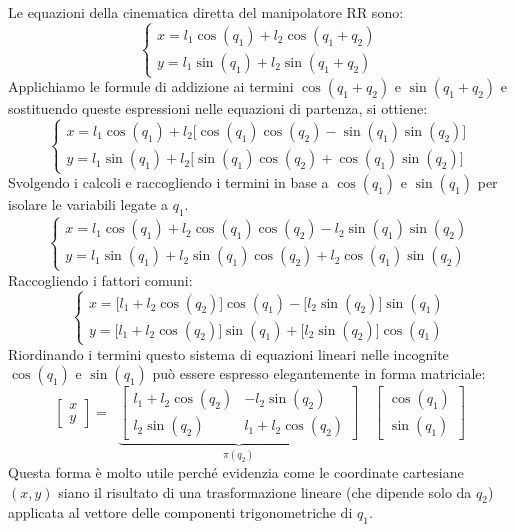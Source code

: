 \documentclass[11pt, a4paper]{report}
\begin{document}
Le equazioni della cinematica diretta del manipolatore RR sono:
\[
    \begin{cases}
        x = l_1 \cos(q_1) + l_2 \cos(q_1 + q_2) \\
        y = l_1 \sin(q_1) + l_2 \sin(q_1 + q_2)
    \end{cases}
\]
Applichiamo le formule di addizione ai termini $\cos(q_1 + q_2)$ e $\sin(q_1 + q_2)$ e sostituendo queste espressioni nelle equazioni di partenza, si ottiene:
\[
    \begin{cases}
        x = l_1 \cos(q_1) + l_2\biggl[\cos(q_{1})\cos(q_{2}) - \sin(q_{1})\sin(q_{2}) \biggr] \\
        y = l_1 \sin(q_1) + l_2\biggl[ \sin(q_{1})\cos(q_{2}) + \cos(q_{1})\sin(q_{2}) \biggr]
    \end{cases}
\]
Svolgendo i calcoli e raccogliendo i termini in base a $\cos(q_1)$ e $\sin(q_1)$ per isolare le variabili legate a $q_1$.
\[
    \begin{cases}
        x = l_1 \cos(q_1) + l_2\cos(q_{1})\cos(q_{2}) - l_2\sin(q_{1})\sin(q_{2}) \\
        y = l_1 \sin(q_1) + l_2\sin(q_{1})\cos(q_{2}) + l_2\cos(q_{1})\sin(q_{2})
    \end{cases}
\]
Raccogliendo i fattori comuni:
\[
    \begin{cases}
        x = \biggl[l_1 + l_2\cos(q_{2})\biggr]\cos(q_1) - \biggl[l_2\sin(q_{2}) \biggr]\sin(q_{1}) \\
        y = \biggl[l_1 + l_2\cos(q_{2})\biggr]\sin(q_1) + \biggl[l_2\sin(q_{2}) \biggr]\cos(q_{1})
    \end{cases}
\]
Riordinando i termini questo sistema di equazioni lineari nelle incognite $\cos(q_1)$ e $\sin(q_1)$ può essere espresso elegantemente in forma matriciale:
\[
    \begin{bmatrix}
        x\\
        y
    \end{bmatrix}
    =
    \;\;
    \underbrace{\begin{bmatrix}
        l_1 + l_2\cos(q_{2}) & - l_2\sin(q_{2})\\
        l_2\sin(q_{2}) & l_1 + l_2\cos(q_{2})
    \end{bmatrix}}_{\pi(q_{2})}
    \quad
    \begin{bmatrix}
        \cos(q_1)\\
        \sin(q_1)
    \end{bmatrix}
\]
Questa forma è molto utile perché evidenzia come le coordinate cartesiane $(x, y)$ siano il risultato di una trasformazione lineare (che dipende solo da $q_2$) applicata al vettore delle componenti trigonometriche di $q_1$.
\end{document}
